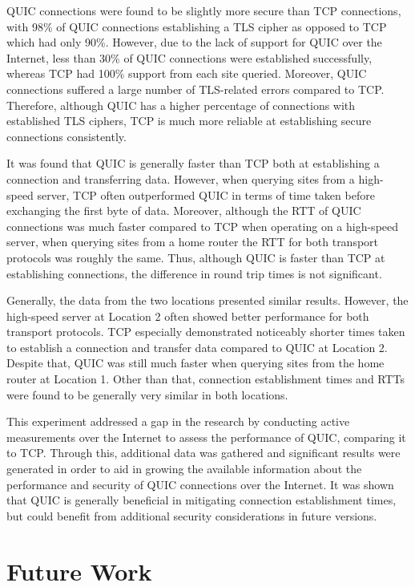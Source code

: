 \documentclass{l4proj}
\begin{document}
QUIC connections were found to be slightly more secure than TCP connections, with 98\% of QUIC connections establishing a TLS cipher as opposed to TCP which had only 90\%. However, due to the lack of support for QUIC over the Internet, less than 30\% of QUIC connections were established successfully, whereas TCP had 100\% support from each site queried. Moreover, QUIC connections suffered a large number of TLS-related errors compared to TCP. Therefore, although QUIC has a higher percentage of connections with established TLS ciphers, TCP is much more reliable at establishing secure connections consistently. 

It was found that QUIC is generally faster than TCP both at establishing a connection and transferring data. However, when querying sites from a high-speed server, TCP often outperformed QUIC in terms of time taken before exchanging the first byte of data. Moreover, although the RTT of QUIC connections was much faster compared to TCP when operating on a high-speed server, when querying sites from a home router the RTT for both transport protocols was roughly the same. Thus, although QUIC is faster than TCP at establishing connections, the difference in round trip times is not significant.

Generally, the data from the two locations presented similar results. However, the high-speed server at Location 2 often showed better performance for both transport protocols. TCP especially demonstrated noticeably shorter times taken to establish a connection and transfer data compared to QUIC at Location 2. Despite that, QUIC was still much faster when querying sites from the home router at Location 1. Other than that, connection establishment times and RTTs were found to be generally very similar in both locations.

This experiment addressed a gap in the research by conducting active measurements over the Internet to assess the performance of QUIC, comparing it to TCP. Through this, additional data was gathered and significant results were generated in order to aid in growing the available information about the performance and security of QUIC connections over the Internet. It was shown that QUIC is generally beneficial in mitigating connection establishment times, but could benefit from additional security considerations in future versions.  


\section{Future Work}
\end{document}
